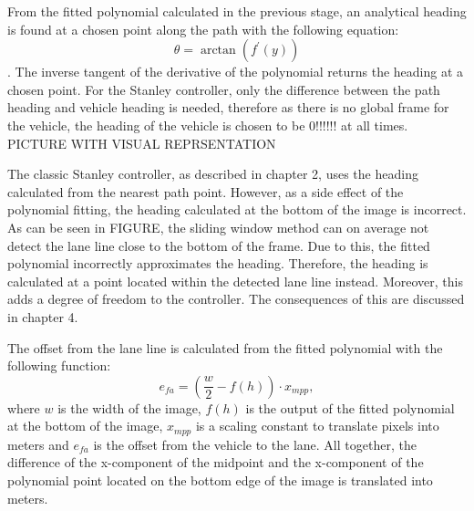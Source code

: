 \documentclass[arbeit=studie,oneside,BCOR=12mm]{ArbeitRST}
\begin{document}
From the fitted polynomial calculated in the previous stage, an analytical
heading is found at a chosen point along the path with the following equation:
$$\theta = \arctan(f^\prime(y))$$. The inverse tangent of the derivative of
the polynomial returns the heading at a chosen point. For the Stanley
controller, only the difference between the path heading and vehicle heading
is needed, therefore as there is no global frame for the vehicle, the heading
of the vehicle is chosen to be 0!!!!!! at all times. PICTURE WITH VISUAL
REPRSENTATION 

The classic Stanley controller, as described in chapter 2, uses the heading
calculated from the nearest path point. However, as a side effect of the
polynomial fitting, the heading calculated at the bottom of the image is
incorrect. As can be seen in FIGURE, the sliding window method can on average
not detect the lane line close to the bottom of the frame. Due to this, the
fitted polynomial incorrectly approximates the heading. Therefore, the heading
is calculated at a point located within the detected lane line instead.
Moreover, this adds a degree of freedom to the controller. The consequences of
this are discussed in chapter 4.


The offset from the lane line is calculated from the fitted polynomial with
the following function: $$e_{fa} = (\frac{w}{2} - f(h))\cdot x_{mpp},$$ where
$w$ is the width of the image, $f(h)$ is the output of the fitted polynomial
at the bottom of the image, $x_{mpp}$ is a scaling constant to translate
pixels into meters and $e_{fa}$ is the offset from the vehicle to the lane.
All together, the difference of the x-component of the midpoint and the
x-component of the polynomial point located on the bottom edge of the image is
translated into meters.
\end{document}
